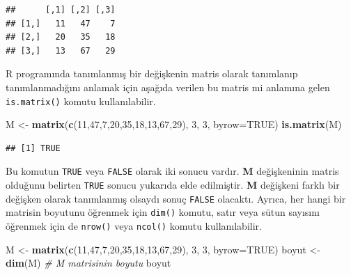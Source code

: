 \documentclass[
]{book}
\newenvironment{Shaded}{\begin{snugshade}}{\end{snugshade}}
\newcommand{\AttributeTok}[1]{\textcolor[rgb]{0.13,0.29,0.53}{#1}}
\newcommand{\CommentTok}[1]{\textcolor[rgb]{0.56,0.35,0.01}{\textit{#1}}}
\newcommand{\ConstantTok}[1]{\textcolor[rgb]{0.56,0.35,0.01}{#1}}
\newcommand{\DecValTok}[1]{\textcolor[rgb]{0.00,0.00,0.81}{#1}}
\newcommand{\FunctionTok}[1]{\textcolor[rgb]{0.13,0.29,0.53}{\textbf{#1}}}
\newcommand{\NormalTok}[1]{#1}
\newcommand{\OtherTok}[1]{\textcolor[rgb]{0.56,0.35,0.01}{#1}}
\begin{document}
\begin{verbatim}
##      [,1] [,2] [,3]
## [1,]   11   47    7
## [2,]   20   35   18
## [3,]   13   67   29
\end{verbatim}

R programında tanımlanmış bir değişkenin matris olarak tanımlanıp tanımlanmadığını anlamak için aşağıda verilen bu matris mi anlamına gelen \texttt{is.matrix()} komutu kullanılabilir.

\begin{Shaded}
\begin{Highlighting}[]
\NormalTok{M }\OtherTok{\textless{}{-}} \FunctionTok{matrix}\NormalTok{(}\FunctionTok{c}\NormalTok{(}\DecValTok{11}\NormalTok{,}\DecValTok{47}\NormalTok{,}\DecValTok{7}\NormalTok{,}\DecValTok{20}\NormalTok{,}\DecValTok{35}\NormalTok{,}\DecValTok{18}\NormalTok{,}\DecValTok{13}\NormalTok{,}\DecValTok{67}\NormalTok{,}\DecValTok{29}\NormalTok{), }\DecValTok{3}\NormalTok{, }\DecValTok{3}\NormalTok{, }\AttributeTok{byrow=}\ConstantTok{TRUE}\NormalTok{) }
\FunctionTok{is.matrix}\NormalTok{(M)}
\end{Highlighting}
\end{Shaded}

\begin{verbatim}
## [1] TRUE
\end{verbatim}

Bu komutun \texttt{TRUE} veya \texttt{FALSE} olarak iki sonucu vardır. \textbf{M} değişkeninin matris olduğunu belirten \texttt{TRUE} sonucu yukarıda elde edilmiştir. \textbf{M} değişkeni farklı bir değişken olarak tanımlanmış olsaydı sonuç \texttt{FALSE} olacaktı. Ayrıca, her hangi bir matrisin boyutunu öğrenmek için \texttt{dim()} komutu, satır veya sütun sayısını öğrenmek için de \texttt{nrow()} veya \texttt{ncol()} komutu kullanılabilir.

\begin{Shaded}
\begin{Highlighting}[]
\NormalTok{M }\OtherTok{\textless{}{-}} \FunctionTok{matrix}\NormalTok{(}\FunctionTok{c}\NormalTok{(}\DecValTok{11}\NormalTok{,}\DecValTok{47}\NormalTok{,}\DecValTok{7}\NormalTok{,}\DecValTok{20}\NormalTok{,}\DecValTok{35}\NormalTok{,}\DecValTok{18}\NormalTok{,}\DecValTok{13}\NormalTok{,}\DecValTok{67}\NormalTok{,}\DecValTok{29}\NormalTok{), }\DecValTok{3}\NormalTok{, }\DecValTok{3}\NormalTok{, }\AttributeTok{byrow=}\ConstantTok{TRUE}\NormalTok{) }
\NormalTok{boyut }\OtherTok{\textless{}{-}} \FunctionTok{dim}\NormalTok{(M)         }\CommentTok{\# M matrisinin boyutu }
\NormalTok{boyut }
\end{Highlighting}
\end{Shaded}
\end{document}
